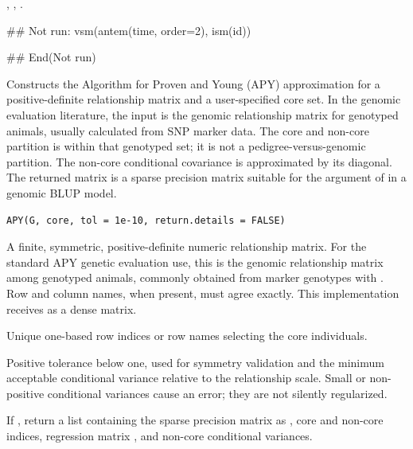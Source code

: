 \documentclass[a4paper]{book}
\begin{document}
%
\begin{SeeAlso}\relax
{}, , .
\end{SeeAlso}
%
\begin{Examples}
\begin{ExampleCode}
## Not run: 
vsm(antem(time, order=2), ism(id))

## End(Not run)
\end{ExampleCode}
\end{Examples}
%
\begin{Description}\relax
Constructs the Algorithm for Proven and Young (APY) approximation for a
positive-definite relationship matrix and a user-specified core set. In the
genomic evaluation literature, the input is the genomic relationship matrix
 for genotyped animals, usually calculated from SNP marker data. The
core and non-core partition is within that genotyped set; it is not a
pedigree-versus-genomic partition. The non-core conditional covariance is
approximated by its diagonal. The returned matrix is a sparse precision matrix
suitable for the  argument of  in a genomic BLUP model.
\end{Description}
%
\begin{Usage}
\begin{verbatim}
APY(G, core, tol = 1e-10, return.details = FALSE)
\end{verbatim}
\end{Usage}
%
\begin{Arguments}
\begin{ldescription}
\item[\code{G}] A finite, symmetric, positive-definite numeric relationship matrix.
For the standard APY genetic evaluation use, this is the genomic relationship
matrix among genotyped animals, commonly obtained from marker genotypes with
. Row and column names, when present, must agree exactly. This
implementation receives  as a dense matrix.
\item[\code{core}] Unique one-based row indices or row names selecting the core
individuals.
\item[\code{tol}] Positive tolerance below one, used for symmetry validation and
the minimum acceptable conditional variance relative to the relationship
scale. Small or non-positive conditional variances cause an error; they are
not silently regularized.
\item[\code{return.details}] If , return a list containing the sparse
precision matrix as , core and non-core indices, regression matrix
, and non-core conditional variances.
\end{ldescription}
\end{Arguments}
\end{document}
